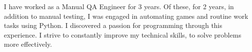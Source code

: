 \documentclass[a4paper, 12pt]{article}
\begin{document}
I have worked as a Manual QA Engineer for 3 years.
Of these, for 2 years, in addition to manual testing,
I was engaged in automating games and routine work tasks using Python.
I discovered a passion for programming through this experience.
I strive to constantly improve my technical skills, to solve problems more effectively.
\end{document}

